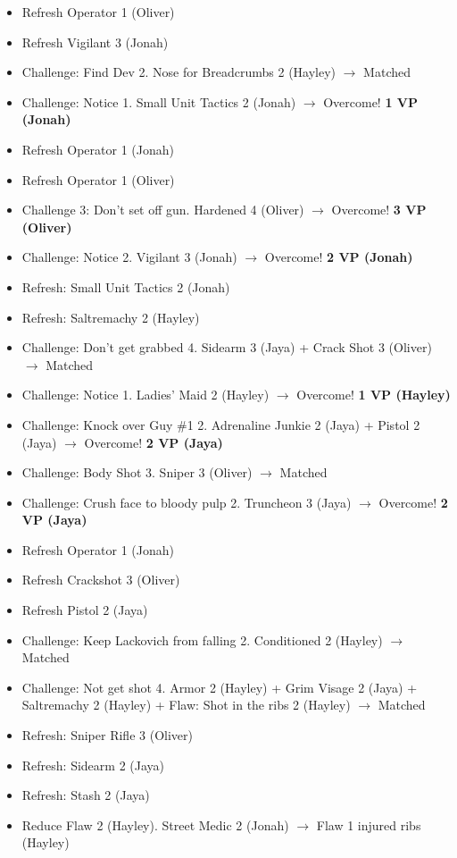 \begin{itemize}
\item Refresh Operator 1 (Oliver)
\item Refresh Vigilant 3 (Jonah)
\item Challenge: Find Dev 2. Nose for Breadcrumbs 2 (Hayley) $\rightarrow$ Matched
\item Challenge: Notice 1.  Small Unit Tactics 2 (Jonah) $\rightarrow$ Overcome! \textbf{1 VP (Jonah)}
\item Refresh Operator 1 (Jonah)
\item Refresh Operator 1 (Oliver)
\item Challenge 3: Don't set off gun.  Hardened 4 (Oliver) $\rightarrow$ Overcome! \textbf{3 VP (Oliver)}
\item Challenge: Notice 2.  Vigilant 3 (Jonah)  $\rightarrow$ Overcome! \textbf{2 VP (Jonah)}
\item Refresh: Small Unit Tactics 2 (Jonah)
\item Refresh: Saltremachy 2 (Hayley)
\item Challenge: Don't get grabbed 4.  Sidearm 3 (Jaya) + Crack Shot 3 (Oliver) $\rightarrow$ Matched
\item Challenge: Notice 1.  Ladies' Maid 2 (Hayley) $\rightarrow$ Overcome! \textbf{1 VP (Hayley)}
\item Challenge: Knock over Guy \#1 2.  Adrenaline Junkie 2 (Jaya) + Pistol 2 (Jaya)  $\rightarrow$ Overcome! \textbf{2 VP (Jaya)}
\item Challenge: Body Shot 3.  Sniper 3 (Oliver) $\rightarrow$ Matched
\item Challenge: Crush face to bloody pulp 2.  Truncheon 3 (Jaya)  $\rightarrow$ Overcome! \textbf{2 VP (Jaya)}
\item Refresh Operator 1 (Jonah)
\item Refresh Crackshot 3 (Oliver)
\item Refresh Pistol 2 (Jaya)
\item Challenge: Keep Lackovich from falling 2.  Conditioned 2 (Hayley) $\rightarrow$ Matched
\item Challenge: Not get shot 4.  Armor 2 (Hayley) + Grim Visage 2 (Jaya) + Saltremachy 2 (Hayley) + Flaw: Shot in the ribs 2 (Hayley) $\rightarrow$ Matched
\item Refresh: Sniper Rifle 3 (Oliver)
\item Refresh: Sidearm 2 (Jaya)
\item Refresh: Stash 2 (Jaya)
\item Reduce Flaw 2 (Hayley).  Street Medic 2 (Jonah) $\rightarrow$  {\color[RGB]{255,0,0}Flaw 1 injured ribs (Hayley)} 

\end{itemize}

